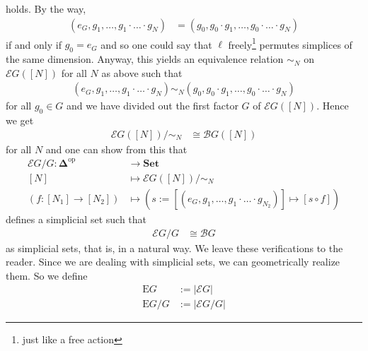 holds.
By the way,
\begin{align*}
  \left(
    e_{G},
    g_{1},
    \ldots,
    g_{1}
    \cdot
    \ldots
    \cdot
    g_{N}
  \right)
  &=
  \left(
    g_{0},
    g_{0}
    \cdot
    g_{1},
    \ldots,
    g_{0}
    \cdot
    \ldots
    \cdot
    g_{N}
  \right)
\end{align*}
if and only if $g_{0} = e_{G}$ and so one could say that $\ell$ freely\footnote{just like a free action} permutes simplices of the same dimension.
Anyway, this yields an equivalence relation $\sim_{N}$ on $\mathcal{E}G([N])$ for all $N$ as above such that
\begin{align*}
  \left(
    e_{G},
    g_{1},
    \ldots,
    g_{1}
    \cdot
    \ldots
    \cdot
    g_{N}
  \right)
  \sim_{N}
  \left(
    g_{0},
    g_{0}
    \cdot
    g_{1},
    \ldots,
    g_{0}
    \cdot
    \ldots
    \cdot
    g_{N}
  \right)
\end{align*}
for all $g_{0} \in G$ and we have divided out the first factor $G$ of $\mathcal{E}G([N])$.
Hence we get
\begin{align*}
  \mathcal{E}G
  \left(
    [N]
  \right)
  \slash
  \sim_{N}
  &\cong
  \mathcal{B}G
  \left(
    [N]
  \right)
\end{align*}
for all $N$ and one can show from this that
\begin{align*}
  \mathcal{E}G
  \slash
  G
  \colon
  \mathbf{\Delta}^{\mathrm{op}}
  &\rightarrow
  \mathbf{Set}
  \\
  [N]
  &\mapsto
  \mathcal{E}G
  \left(
    [N]
  \right)
  \slash
  \sim_{N}
  \\
  \left(
    f
    \colon
    [N_{1}]
    \rightarrow
    [N_{2}]
  \right)
  &\mapsto
  \left(
    s
    :=
    \left[
      \left(
        e_{G},
        g_{1},
        \ldots,
        g_{1}
        \cdot
        \ldots
        \cdot
        g_{N_{2}}
      \right)
    \right]
    \mapsto
    [s \circ f]
  \right)
\end{align*}
defines a simplicial set such that
\begin{align*}
  \mathcal{E}G
  \slash
  G
  &\cong
  \mathcal{B}G
\end{align*}
as simplicial sets, that is, in a natural way.
We leave these verifications to the reader.
Since we are dealing with simplicial sets, we can geometrically realize them.
So we define
\begin{align*}
  \mathrm{E}G
  &:=
  \vert
    \mathcal{E}G
  \vert
  \\
  \mathrm{E}G
  \slash
  G
  &:=
  \vert
    \mathcal{E}G
    \slash
    G
  \vert
\end{align*}
